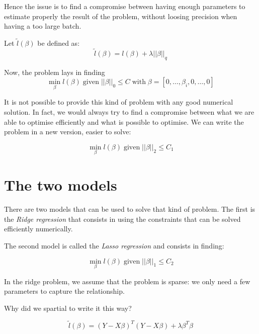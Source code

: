 \documentclass[a4paper]{tufte-book}
\begin{document}
Hence the issue is to find a compromise between having enough parameters to
estimate properly the result of the problem, without loosing precision when
having a too large batch.


Let $\tilde{l}(\beta)$ be defined as:
\begin{equation}
    \tilde{l}(\beta) = l(\beta) + \lambda ||\beta||_q
\end{equation}

Now, the problem lays in finding
\begin{equation}
    \min_\beta l(\beta) \; \text{given} \; ||\beta||_0 \leq C
    \; \text{with} \; \beta = [0, \ldots, \beta_i, 0, \ldots, 0]
\end{equation}

It is not possible to provide this kind of problem with any good numerical
solution. In fact, we would always try to find a compromise between what we are able to optimise efficiently and what is possible to optimise. We can
write the problem in a new version, easier to solve:

\begin{equation}
    \min_\beta l(\beta) \; \text{given}\; ||\beta||_2 \leq C_1
\end{equation}

\section{The two models}

There are two models that can be used to solve that kind of problem. The first
is the \emph{Ridge regression} that consists in using the constraints that can
be solved efficiently numerically.

The second model is called the \emph{Lasso regression} and consists in finding:

\begin{equation}
    \min_\beta l(\beta) \; \text{given} \; ||\beta||_1 \leq C_2
\end{equation}

In the ridge problem, we assume that the problem is sparse: we only need a few
parameters to capture the relationship.

Why did we spartial to write it this way?

\begin{equation} 
\tilde{l}(\beta) = (Y -X\beta)^T (Y-X\beta) + \lambda \beta^T \beta
\end{equation}
\end{document}
